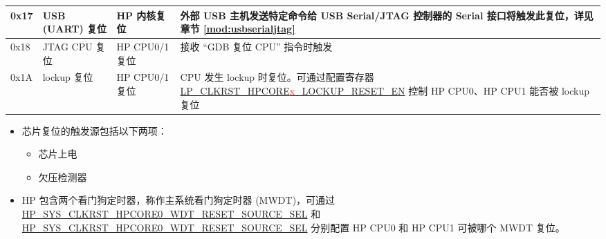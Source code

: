 \documentclass[main\_\_CN.tex]{subfiles}
\begin{document}
\begin{longtable}[c]{ |l|m{3.5cm}|m{2.7cm}|m{8.7cm}| }
        0x17 & USB (UART) 复位 & HP 内核复位 & 外部 USB 主机发送特定命令给 USB Serial/JTAG 控制器的 Serial 接口将触发此复位，详见章节 \ref{mod:usbserialjtag} \textit{\nameref{mod:usbserialjtag}} \\\hline
        0x18 & JTAG CPU 复位 & HP CPU0/1 复位 & 接收 “GDB 复位 CPU” 指令时触发
        \\\hline
        0x1A & lockup 复位 & HP CPU0/1 复位 & CPU 发生 lockup 时复位。可通过配置寄存器 \hyperref[fielddesc:LPCLKRSTHPCORE0LOCKUPRESETEN]{LP\_CLKRST\_HPCORE\textcolor{red}{x}\_LOCKUP\_RESET\_EN} 控制 HP CPU0、HP CPU1 能否被 lockup 复位 \\
        \hline
\end{longtable}

\begin{itemize}
    \item 芯片复位的触发源包括以下两项：
    \begin{itemize}
        \item 芯片上电
        \item 欠压检测器
    \end{itemize}
    \item HP 包含两个看门狗定时器，称作主系统看门狗定时器 (MWDT)，可通过 \hyperref[fielddesc:HPSYSCLKRSTHPCORE0WDTRESETSOURCESEL]{HP\_SYS\_CLKRST\_HPCORE0\_WDT\_RESET\_SOURCE\_SEL} 和 \\\hyperref[fielddesc:HPSYSCLKRSTHPCORE1WDTRESETSOURCESEL]{HP\_SYS\_CLKRST\_HPCORE0\_WDT\_RESET\_SOURCE\_SEL} 分别配置 HP CPU0 和 HP CPU1 可被哪个 MWDT 复位。
\end{itemize}
\end{document}
